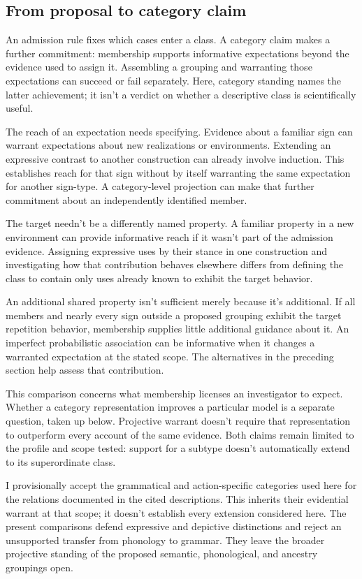 \documentclass[12pt]{article}
\begin{document}
\subsection{From proposal to category claim}

An admission rule fixes which cases enter a class. A category claim
makes a further commitment: membership supports informative expectations
beyond the evidence used to assign it. Assembling a grouping and
warranting those expectations can succeed or fail separately. Here,
category standing names the latter achievement; it isn't a verdict
on whether a descriptive class is scientifically useful.

The reach of an expectation needs specifying. Evidence about a familiar
sign can warrant expectations about new realizations or environments.
Extending an expressive contrast to another construction can already
involve induction. This establishes reach for that sign without by
itself warranting the same expectation for another sign-type. A
category-level projection can make that further commitment about an
independently identified member.

The target needn't be a differently named property. A familiar property
in a new environment can provide informative reach if it wasn't part
of the admission evidence. Assigning expressive uses by their stance
in one construction and investigating how that contribution behaves
elsewhere differs from defining the class to contain only uses already
known to exhibit the target behavior.

An additional shared property isn't sufficient merely because it's
additional. If all members and nearly every sign outside a proposed
grouping exhibit the target repetition behavior, membership supplies
little additional guidance about it. An imperfect probabilistic association can be
informative when it changes a warranted expectation at the stated
scope. The alternatives in the preceding section help assess that
contribution.

This comparison concerns what membership licenses an investigator to
expect. Whether a category representation improves a particular model
is a separate question, taken up below. Projective warrant doesn't
require that representation to outperform every account of the same
evidence. Both claims remain limited to the profile and scope tested:
support for a subtype doesn't automatically extend to its superordinate
class.

I provisionally accept the grammatical and action-specific categories
used here for the relations documented in the cited descriptions.
This inherits their evidential warrant at that scope; it doesn't
establish every extension considered here. The present comparisons
defend expressive and depictive distinctions and reject an unsupported
transfer from phonology to grammar. They leave the broader projective
standing of the proposed semantic, phonological, and ancestry groupings
open.
\end{document}
